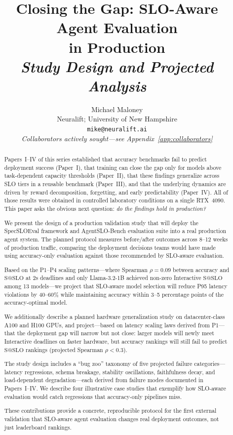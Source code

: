 \documentclass[11pt]{article}
\title{Closing the Gap: SLO-Aware Agent Evaluation\\in Production\\[6pt]
\large\textit{Study Design and Projected Analysis}}
\author{
Michael Maloney \\
Neuralift; University of New Hampshire \\
\texttt{mike@neuralift.ai} \\[6pt]
{\small\textit{Collaborators actively sought---see Appendix~\ref{app:collaborators}}}
}
\date{}
\makeatletter
\newcommand{\sslo}{\ensuremath{\mathrm{S@SLO}}}
\makeatother
\begin{document}
\maketitle

\begin{abstract}
Papers~I--IV of this series established that accuracy benchmarks fail to predict deployment success (Paper~I), that training can close the gap only for models above task-dependent capacity thresholds (Paper~II), that these findings generalize across SLO tiers in a reusable benchmark (Paper~III), and that the underlying dynamics are driven by reward decomposition, forgetting, and early predictability (Paper~IV). All of those results were obtained in controlled laboratory conditions on a single RTX~4090. This paper asks the obvious next question: \emph{do the findings hold in production?}

We present the design of a production validation study that will deploy the SpecSLOEval framework and AgentSLO-Bench evaluation suite into a real production agent system. The planned protocol measures before/after outcomes across 8--12 weeks of production traffic, comparing the deployment decisions teams would have made using accuracy-only evaluation against those recommended by SLO-aware evaluation.

Based on the P1--P4 scaling patterns---where Spearman $\rho = 0.09$ between accuracy and $\sslo{}$ at 2s deadlines and only Llama-3.2-1B achieved non-zero Interactive $\sslo{}$ among 13 models---we project that SLO-aware model selection will reduce P95 latency violations by 40--60\% while maintaining accuracy within 3--5 percentage points of the accuracy-optimal model.

We additionally describe a planned hardware generalization study on datacenter-class A100 and H100 GPUs, and project---based on latency scaling laws derived from P1---that the deployment gap will narrow but not close: larger models will newly meet Interactive deadlines on faster hardware, but accuracy rankings will still fail to predict $\sslo{}$ rankings (projected Spearman $\rho < 0.3$).

The study design includes a ``bug zoo'' taxonomy of five projected failure categories---latency regressions, schema breakage, stability oscillations, faithfulness decay, and load-dependent degradation---each derived from failure modes documented in Papers~I--IV. We describe four illustrative case studies that exemplify how SLO-aware evaluation would catch regressions that accuracy-only pipelines miss.

These contributions provide a concrete, reproducible protocol for the first external validation that SLO-aware agent evaluation changes real deployment outcomes, not just leaderboard rankings.
\end{abstract}
\end{document}
